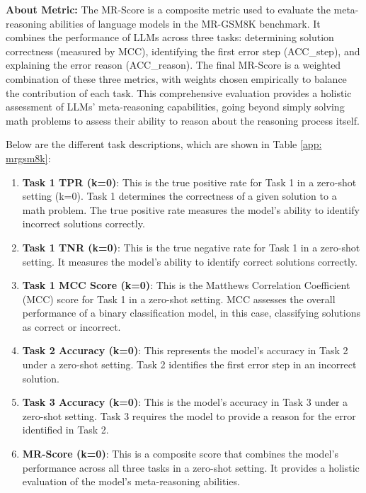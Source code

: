 \textbf{About Metric:} The MR-Score is a composite metric used to evaluate the meta-reasoning abilities of language models in the MR-GSM8K benchmark. It combines the performance of LLMs across three tasks: determining solution correctness (measured by MCC), identifying the first error step (ACC\_{\small step}), and explaining the error reason (ACC\_{\small reason}). The final MR-Score is a weighted combination of these three metrics, with weights chosen empirically to balance the contribution of each task. This comprehensive evaluation provides a holistic assessment of LLMs' meta-reasoning capabilities, going beyond simply solving math problems to assess their ability to reason about the reasoning process itself.\medskip

Below are the different task descriptions, which are shown in Table \ref{app: mrgsm8k}:

\begin{enumerate}

\item \textbf{Task 1 TPR (k=0)}: This is the true positive rate for Task 1 in a zero-shot setting (k=0). Task 1 determines the correctness of a given solution to a math problem. The true positive rate measures the model's ability to identify incorrect solutions correctly.

\item \textbf{Task 1 TNR (k=0)}: This is the true negative rate for Task 1 in a zero-shot setting. It measures the model's ability to identify correct solutions correctly.

\item \textbf{Task 1 MCC Score (k=0)}: This is the Matthews Correlation Coefficient (MCC) score for Task 1 in a zero-shot setting. MCC assesses the overall performance of a binary classification model, in this case, classifying solutions as correct or incorrect.

\item \textbf{Task 2 Accuracy (k=0)}: This represents the model's accuracy in Task 2 under a zero-shot setting. Task 2 identifies the first error step in an incorrect solution.

\item \textbf{Task 3 Accuracy (k=0)}: This is the model's accuracy in Task 3 under a zero-shot setting. Task 3 requires the model to provide a reason for the error identified in Task 2.

\item \textbf{MR-Score (k=0)}: This is a composite score that combines the model's performance across all three tasks in a zero-shot setting. It provides a holistic evaluation of the model's meta-reasoning abilities.
\end{enumerate}

